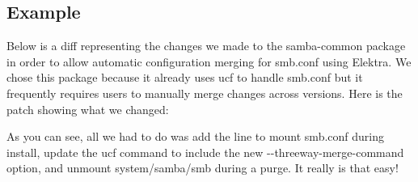 \subsection*{Example}

Below is a diff representing the changes we made to the samba-\/common package in order to allow automatic configuration merging for {\ttfamily smb.\+conf} using Elektra. We chose this package because it already uses ucf to handle {\ttfamily smb.\+conf} but it frequently requires users to manually merge changes across versions. Here is the patch showing what we changed\+: 


As you can see, all we had to do was add the line to mount {\ttfamily smb.\+conf} during install, update the ucf command to include the new {\ttfamily -\/-\/threeway-\/merge-\/command} option, and unmount {\ttfamily system/samba/smb} during a purge. It really is that easy! 
